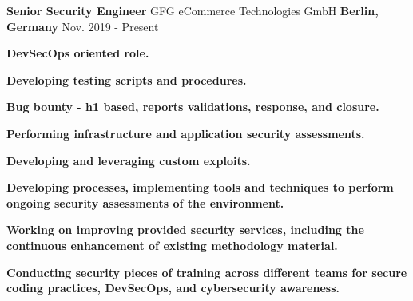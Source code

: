

\begin{cventries}

\cventry
{\textbf{\Large Senior Security Engineer}} %
{GFG eCommerce Technologies GmbH} %
{\textbf{\Large Berlin, Germany}} %
{Nov. 2019 - Present} %
{
\begin{cvitems} %
\item {\textbf{\large DevSecOps oriented role.}}
\item {\textbf{\large Developing testing scripts and procedures.}}
\item {\textbf{\large Bug bounty - h1 based, reports validations, response, and closure.}}
\item {\textbf{\large Performing infrastructure and application security assessments.}}
\item {\textbf{\large Developing and leveraging custom exploits.}}
\item {\textbf{\large Developing processes, implementing tools and techniques to perform ongoing security assessments of the environment.}}
\item {\textbf{\large Working on improving provided security services, including the continuous enhancement of existing methodology material.}}
\item {\textbf{\large Conducting security pieces of training across different teams for secure coding practices, DevSecOps, and cybersecurity awareness.}}
\end{cvitems}
}


\end{cventries}
